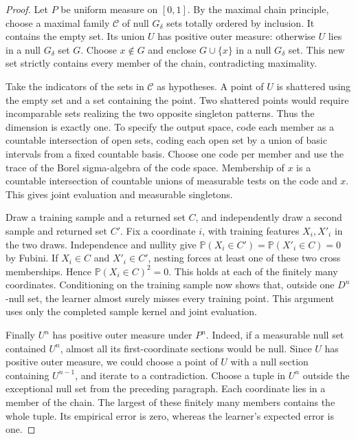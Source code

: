 \documentclass[11pt]{article}
\theoremstyle{definition}\newtheorem{definition}[theorem]{Definition}
\newcommand{\Prob}{\mathbb P}
\begin{document}
\begin{proof}
Let $P$ be uniform measure on $[0,1]$. By the maximal chain principle,
choose a maximal family $\mathcal C$ of null $G_\delta$ sets totally
ordered by inclusion. It contains the empty set. Its union $U$ has positive
outer measure: otherwise $U$ lies in a null $G_\delta$ set $G$. Choose
$x\notin G$ and enclose $G\cup\{x\}$ in a null $G_\delta$ set. This new set strictly contains every
member of the chain, contradicting maximality.

Take the indicators of the sets in $\mathcal C$ as hypotheses. A point of
$U$ is shattered using the empty set and a set containing the point.
Two shattered points would require incomparable sets realizing the two
opposite singleton patterns. Thus the dimension is exactly one. To specify
the output space, code each member as a countable intersection of open sets,
coding each open set by a union of basic intervals from a fixed countable
basis. Choose one code per member and use the trace of the Borel
sigma-algebra of the code space. Membership of $x$ is a countable
intersection of countable unions of measurable tests on the code and $x$.
This gives joint evaluation and measurable singletons.

Draw a training sample and a returned set $C$, and independently draw a
second sample and returned set $C'$. Fix a coordinate $i$, with training
features $X_i,X'_i$ in the two draws. Independence and nullity give
$\Prob(X_i\in C')=\Prob(X'_i\in C)=0$ by Fubini. If $X_i\in C$ and
$X'_i\in C'$, nesting forces at least one of these two cross memberships.
Hence $\Prob(X_i\in C)^2=0$. This holds at each of the finitely many
coordinates. Conditioning on the training sample now shows that, outside
one $D^n$-null set, the learner almost surely misses every training point.
This argument uses only the completed sample kernel and joint evaluation.

Finally $U^n$ has positive outer measure under $P^n$. Indeed, if a measurable
null set contained $U^n$, almost all its first-coordinate sections would be
null. Since $U$ has positive outer measure, we could choose a point of $U$
with a null section containing $U^{n-1}$, and iterate to a contradiction.
Choose a tuple in $U^n$ outside the exceptional null set from the preceding
paragraph. Each coordinate lies in a member of the chain. The largest of
these finitely many members contains the whole tuple. Its empirical error
is zero, whereas the learner's expected error is one.
\end{proof}
\end{document}

